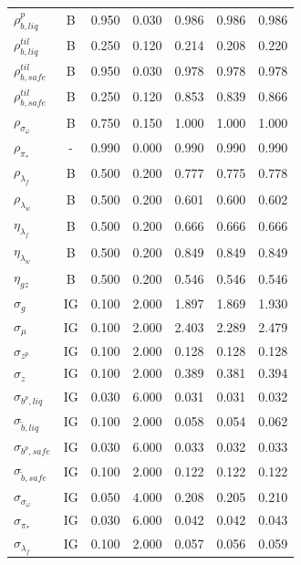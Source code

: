 \documentclass[12pt]{article}
\begin{document}
{\begin{longtable}{lcccccc}
$\rho_{b,liq}^{p}$ & B &    0.950 &    0.030 &    0.986 &    0.986 &    0.986 \\
$\rho_{b,liq}^{til}$ & B &    0.250 &    0.120 &    0.214 &    0.208 &    0.220 \\
$\rho_{b,safe}^{til}$ & B &    0.950 &    0.030 &    0.978 &    0.978 &    0.978 \\
$\rho_{b,safe}^{til}$ & B &    0.250 &    0.120 &    0.853 &    0.839 &    0.866 \\
$\rho_{\sigma_\omega}$ & B &    0.750 &    0.150 &    1.000 &    1.000 &    1.000 \\
$\rho_{\pi_*}$ & - &    0.990 &    0.000 &    0.990 &    0.990 &    0.990 \\
$\rho_{\lambda_f}$ & B &    0.500 &    0.200 &    0.777 &    0.775 &    0.778 \\
$\rho_{\lambda_w}$ & B &    0.500 &    0.200 &    0.601 &    0.600 &    0.602 \\
$\eta_{\lambda_f}$ & B &    0.500 &    0.200 &    0.666 &    0.666 &    0.666 \\
$\eta_{\lambda_w}$ & B &    0.500 &    0.200 &    0.849 &    0.849 &    0.849 \\
$\eta_{gz}$ & B &    0.500 &    0.200 &    0.546 &    0.546 &    0.546 \\
$\sigma_{g}$ & IG &    0.100 &    2.000 &    1.897 &    1.869 &    1.930 \\
$\sigma_{\mu}$ & IG &    0.100 &    2.000 &    2.403 &    2.289 &    2.479 \\
$\sigma_{z^p}$ & IG &    0.100 &    2.000 &    0.128 &    0.128 &    0.128 \\
$\sigma_{z}$ & IG &    0.100 &    2.000 &    0.389 &    0.381 &    0.394 \\
$\sigma_{b^p, liq}$ & IG &    0.030 &    6.000 &    0.031 &    0.031 &    0.032 \\
$\sigma_{\tilde{b}, liq}$ & IG &    0.100 &    2.000 &    0.058 &    0.054 &    0.062 \\
$\sigma_{b^p, safe}$ & IG &    0.030 &    6.000 &    0.033 &    0.032 &    0.033 \\
$\sigma_{\tilde{b}, safe}$ & IG &    0.100 &    2.000 &    0.122 &    0.122 &    0.122 \\
$\sigma_{\sigma_\omega}$ & IG &    0.050 &    4.000 &    0.208 &    0.205 &    0.210 \\
$\sigma_{\pi_*}$ & IG &    0.030 &    6.000 &    0.042 &    0.042 &    0.043 \\
$\sigma_{\lambda_f}$ & IG &    0.100 &    2.000 &    0.057 &    0.056 &    0.059 \\

\end{longtable}}
\end{document}

